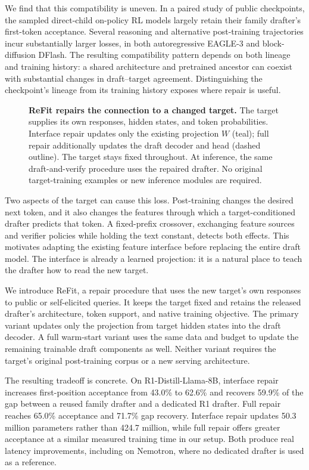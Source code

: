 \documentclass[11pt]{article}
\newcommand{\method}{ReFit}
\begin{document}
We find that this compatibility is uneven. In a paired study of public checkpoints, the sampled direct-child on-policy RL models largely retain their family drafter's first-token acceptance. Several reasoning and alternative post-training trajectories incur substantially larger losses, in both autoregressive EAGLE-3 and block-diffusion DFlash. The resulting compatibility pattern depends on both lineage and training history: a shared architecture and pretrained ancestor can coexist with substantial changes in draft--target agreement. Distinguishing the checkpoint's lineage from its training history exposes where repair is useful.

\begin{figure}[t]
\centering
\resizebox{\textwidth}{!}{}
\caption{\textbf{\method{} repairs the connection to a changed target.} The target supplies its own responses, hidden states, and token probabilities. Interface repair updates only the existing projection $W$ (teal); full repair additionally updates the draft decoder and head (dashed outline). The target stays fixed throughout. At inference, the same draft-and-verify procedure uses the repaired drafter. No original target-training examples or new inference modules are required.}
\label{fig:hero}
\end{figure}

Two aspects of the target can cause this loss. Post-training changes the desired next token, and it also changes the features through which a target-conditioned drafter predicts that token. A fixed-prefix crossover, exchanging feature sources and verifier policies while holding the text constant, detects both effects. This motivates adapting the existing feature interface before replacing the entire draft model. The interface is already a learned projection: it is a natural place to teach the drafter how to read the new target.

We introduce \method{}, a repair procedure that uses the new target's own responses to public or self-elicited queries. It keeps the target fixed and retains the released drafter's architecture, token support, and native training objective. The primary variant updates only the projection from target hidden states into the draft decoder. A full warm-start variant uses the same data and budget to update the remaining trainable draft components as well. Neither variant requires the target's original post-training corpus or a new serving architecture.

The resulting tradeoff is concrete. On R1-Distill-Llama-8B, interface repair increases first-position acceptance from 43.0\% to 62.6\% and recovers 59.9\% of the gap between a reused family drafter and a dedicated R1 drafter. Full repair reaches 65.0\% acceptance and 71.7\% gap recovery. Interface repair updates 50.3 million parameters rather than 424.7 million, while full repair offers greater acceptance at a similar measured training time in our setup. Both produce real latency improvements, including on Nemotron, where no dedicated drafter is used as a reference.
\end{document}
